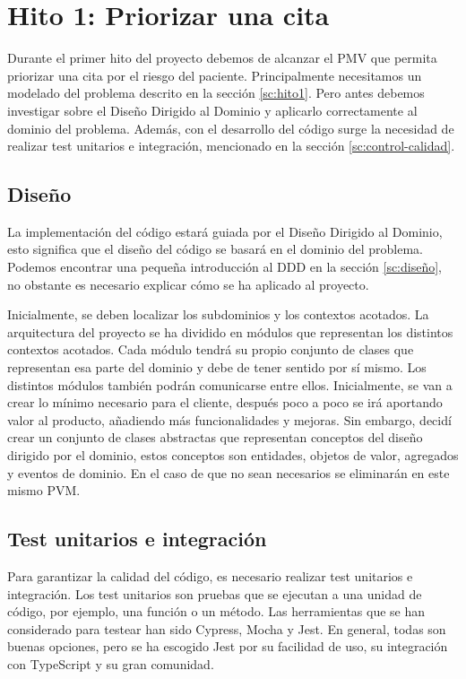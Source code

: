 \section{Hito 1: Priorizar una cita}

Durante el primer hito del proyecto debemos de alcanzar el PMV que permita priorizar una cita por el riesgo del paciente.
Principalmente necesitamos un modelado del problema descrito en la sección \ref{sc:hito1}.
Pero antes debemos investigar sobre el Diseño Dirigido al Dominio y aplicarlo correctamente al dominio del problema. Además, con el desarrollo del
código surge la necesidad de realizar test unitarios e integración, mencionado en la sección \ref{sc:control-calidad}.

\subsection{Diseño}
La implementación del código estará guiada por el Diseño Dirigido al Dominio, esto significa que el diseño del código se basará en el dominio del problema.
Podemos encontrar una pequeña introducción al DDD en la sección \ref{sc:diseño}, no obstante es necesario explicar cómo se ha aplicado al proyecto.

Inicialmente, se deben localizar los subdominios y los contextos acotados. La arquitectura del proyecto se ha dividido en módulos que representan los distintos contextos acotados.
Cada módulo tendrá su propio conjunto de clases que representan esa parte del dominio y debe de tener sentido por sí mismo. Los distintos módulos también podrán comunicarse entre ellos.
Inicialmente, se van a crear lo mínimo necesario para el cliente, después poco a poco se irá aportando valor al producto, añadiendo más funcionalidades y mejoras.
Sin embargo, decidí crear un conjunto de clases abstractas que representan conceptos del diseño dirigido por el dominio, estos conceptos son entidades, objetos de valor, agregados y eventos de dominio.
En el caso de que no sean necesarios se eliminarán en este mismo PVM.

\subsection{Test unitarios e integración}
Para garantizar la calidad del código, es necesario realizar test unitarios e integración. Los test unitarios son pruebas que se ejecutan a una unidad de código, por ejemplo, una función o un método.
Las herramientas que se han considerado para testear han sido Cypress, Mocha y Jest.
En general, todas son buenas opciones, pero se ha escogido Jest por su facilidad de uso, su integración con TypeScript y su gran comunidad.
